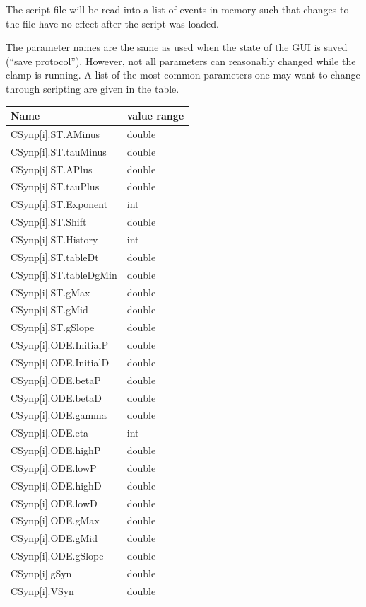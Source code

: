 \documentclass{article}
\begin{document}
The script file will be read into a list of events in memory such that
changes to the file have no effect after the script was loaded.

The parameter names are the same as used when the state of the GUI is
saved (``save protocol''). However, not all parameters can reasonably
changed while the clamp is running. A list of the most common
parameters one may want to change through scripting are given in the table. \\
\begin{table}
\begin{tabular}[t]{|ll|}
\hline
{\bf Name} & {\bf value range} \\
\hline
CSynp[i].ST.AMinus & double \\
CSynp[i].ST.tauMinus & double \\
CSynp[i].ST.APlus & double \\
CSynp[i].ST.tauPlus & double \\
CSynp[i].ST.Exponent & int \\
CSynp[i].ST.Shift & double \\
CSynp[i].ST.History & int \\
CSynp[i].ST.tableDt & double \\
CSynp[i].ST.tableDgMin & double \\
CSynp[i].ST.gMax & double \\
CSynp[i].ST.gMid & double \\
CSynp[i].ST.gSlope & double \\
CSynp[i].ODE.InitialP & double \\
CSynp[i].ODE.InitialD & double \\
CSynp[i].ODE.betaP & double \\
CSynp[i].ODE.betaD & double \\
CSynp[i].ODE.gamma & double \\ 
CSynp[i].ODE.eta & int \\
CSynp[i].ODE.highP & double \\
CSynp[i].ODE.lowP & double \\
CSynp[i].ODE.highD & double \\
CSynp[i].ODE.lowD & double \\
CSynp[i].ODE.gMax & double \\
CSynp[i].ODE.gMid & double \\
CSynp[i].ODE.gSlope & double \\
CSynp[i].gSyn & double \\
CSynp[i].VSyn & double \\

\end{tabular}
\end{table}
\end{document}
